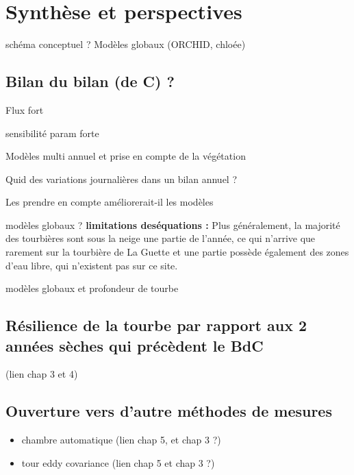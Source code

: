 \chapter*{Synthèse et perspectives}
\newpage

schéma conceptuel ? Modèles globaux (ORCHID, chloée)

\section{Bilan du bilan (de C) ?}

Flux fort

sensibilité param forte

Modèles multi annuel et prise en compte de la végétation

Quid des variations journalières dans un bilan annuel ? 

Les prendre en compte améliorerait-il les modèles

modèles globaux ?
\textbf{limitations deséquations :}
Plus généralement, la majorité des tourbières sont sous la neige une partie de l'année, ce qui n'arrive que rarement sur la tourbière de La Guette et une partie possède également des zones d'eau libre, qui n'existent pas sur ce site.

modèles globaux et profondeur de tourbe

\section{Résilience de la tourbe par rapport aux 2 années sèches qui précèdent le BdC}
(lien chap 3 et 4)

\section{Ouverture vers d'autre méthodes de mesures}
\begin{itemize}
\item chambre automatique (lien chap 5, et chap 3 ?)
\item tour eddy covariance (lien chap 5 et chap 3 ?)
\end{itemize}
